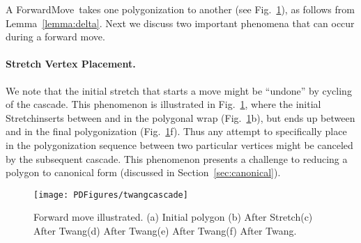\pdfoutput=1  \documentclass{article}
\def\st{{\sc Stretch}}
\def\tw{{\sc Twang}}
\def\fm{{\sc ForwardMove}}
\newcommand{\hide}[1]{}
\newcommand{\figlab}[1]{\label{fig:#1}}
\newcommand{\lemref}[1]{\ref{lemma:#1}}
\newcommand{\secref}[1]{\ref{sec:#1}}
\newcommand{\figref}[1]{\ref{fig:#1}}
\begin{document}
A \fm\ takes one polygonization  to another  (see
Fig.~\figref{twang.cascade}), as follows from
Lemma~\lemref{delta}.
Next we discuss two important phenomena that can occur
during a forward move.


\vspace{-0.5em}
\paragraph{Stretch Vertex Placement.} We note that the initial
stretch that starts a move might be ``undone''
by cycling of the cascade. This phenomenon is illustrated in
Fig.~\figref{twang.cascade}, where the initial \st inserts
 between  and  in the polygonal wrap
(Fig.~\figref{twang.cascade}b), but  ends up between  and 
in the final polygonization (Fig.~\figref{twang.cascade}f). Thus any
attempt to specifically place  in the polygonization sequence
between two particular vertices might be canceled by the subsequent
cascade. This phenomenon presents a challenge to reducing a polygon
to canonical form (discussed in Section~\secref{canonical}).

\vspace{-1.5em}
\begin{figure}[htbp]
\centering
\texttt{[image: PDFigures/twangcascade]}
\vspace{-1.7em} \caption{Forward move illustrated. (a) Initial
polygon  (b) After \st (c) After \tw (d)
After \tw (e) After \tw (f) After
\tw.\vspace{-0.7em}} \figlab{twang.cascade}
\end{figure}


\hide{
\paragraph{Multiple Vertex Twangs.}
A point can twang more than once during the twang cascade, as
illustrated in Fig.~\figref{double.twang}. 
This possibility blocks one route toward
establishing a combinatorial upper bound on the number
of twangs in a cascade.
Note that in the example in Fig.~\figref{double.twang}g, there
is a choice about which vertex sequence to twang (either 
or ) and that only \tw() leads to  twanging twice.
We conjecture that 
a judicious choice of twang sequence
will lead to a linear bound on the number of
twangs in a cascade.


\vspace{-0.5em}
\begin{figure}[htbp]
\centering
\texttt{[image: PDFigures/doubletwang]}
\vspace{-1.7em}\caption{Point  twangs twice: (a) Initial  (b)
After  \st (c--i) After \tw, 
(i)  in double contact a second time. } \figlab{double.twang}
\end{figure}
}
\end{document}
